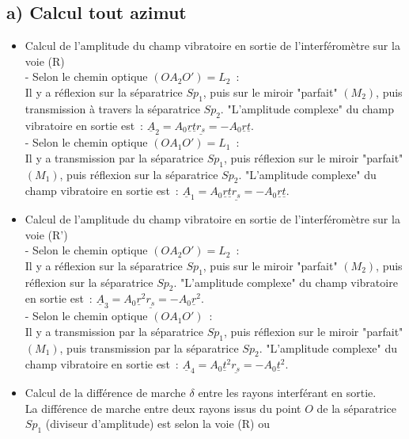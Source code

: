 \documentclass{article}
\begin{document}
\subsection*{a) Calcul tout azimut}
\begin{itemize}
\item Calcul de l'amplitude du champ vibratoire en sortie de l'interféromètre sur la voie
(R) \\
-   Selon le chemin optique $\left(OA_{2}O'\right)=L_{2}$ : \\
Il y a réflexion sur la séparatrice $Sp_{1}$, puis sur le miroir
"parfait" $\left(M_{2}\right)$, puis transmission à travers la séparatrice
$Sp_{2}$. "L'amplitude complexe" du champ vibratoire en sortie est :
$\underline{A}_{2} =
A_{0}\underline{r}\underline{t}\underline{r_{s}} = -
A_{0}\underline{r}\underline{t}$. \\
-   Selon le chemin optique $\left(OA_{1}O'\right)=L_{1}$ : \\
Il y a transmission par la séparatrice $Sp_{1}$, puis réflexion sur
le miroir "parfait" $\left(M_{1}\right)$, puis réflexion sur la séparatrice
$Sp_{2}$. "L'amplitude complexe" du champ vibratoire en sortie est :
$\underline{A}_{1} =
A_{0}\underline{r}\underline{t}\underline{r_{s}} = -
A_{0}\underline{r}\underline{t}$.
\item Calcul de l'amplitude du champ vibratoire en sortie de
l'interféromètre sur la voie (R') \\
-   Selon le chemin optique $\left(OA_{2}O'\right)=L_{2}$ : \\
Il y a réflexion sur la séparatrice $Sp_{1}$, puis sur le miroir
"parfait" $\left(M_{2}\right)$, puis réflexion sur la séparatrice $Sp_{2}$.
"L'amplitude complexe" du champ vibratoire en sortie est :
$\underline{A}_{3} = A_{0}\underline{r}^{2}\underline{r_{s}} =
-A_{0}\underline{r}^{2}$. \\
-   Selon le chemin optique $\left(OA_{1}O'\right)$ : \\
Il y a transmission par la séparatrice $Sp_{1}$, puis réflexion sur
le miroir "parfait" $\left(M_{1}\right)$, puis transmission par la séparatrice
$Sp_{2}$. "L'amplitude complexe" du champ vibratoire en sortie est :
$\underline{A}_{4} = A_{0}\underline{t}^{2}\underline{r_{s}} = -
A_{0}\underline{t}^{2}$.
\item Calcul de la différence de marche $\delta$ entre les rayons interférant en
sortie. \\
La différence de marche entre deux rayons issus du point $O$ de la
séparatrice $Sp_{1}$ (diviseur d'amplitude) est selon la voie (R) ou

\end{itemize}
\end{document}
